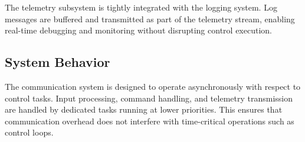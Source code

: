 The telemetry subsystem is tightly integrated with the logging system. Log messages are buffered and transmitted as part of the telemetry stream, enabling real-time debugging and monitoring without disrupting control execution.

\subsection{System Behavior}

The communication system is designed to operate asynchronously with respect to control tasks. Input processing, command handling, and telemetry transmission are handled by dedicated tasks running at lower priorities. This ensures that communication overhead does not interfere with time-critical operations such as control loops.
